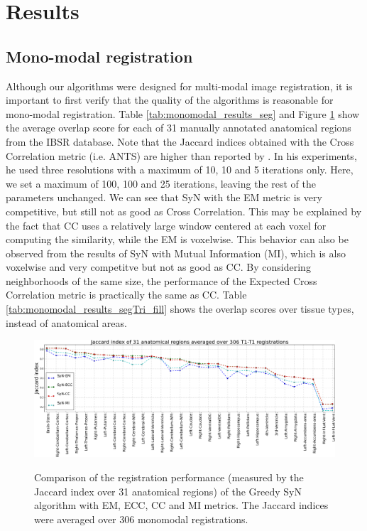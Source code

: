 \section{Results}

\subsection{Mono-modal registration}
Although our algorithms were designed for multi-modal image registration, it is important to first verify that the quality of the algorithms is reasonable for mono-modal registration. Table \ref{tab:monomodal_results_seg} and Figure \ref{fig:mono_graph_seg} show the average overlap score for each of 31 manually annotated anatomical regions from the IBSR database. Note that the Jaccard indices obtained with the Cross Correlation metric (i.e. ANTS) are higher than reported by \cite{Rohlfing2012}. In his experiments, he used
three resolutions with a maximum of 10, 10 and 5 iterations only. Here, we set a maximum of 100, 100 and 25 iterations, leaving the rest of the parameters unchanged. We can see that SyN with the EM metric is very competitive, but still not as good as Cross Correlation. This may be explained by the fact that CC uses a relatively large
window centered at each voxel for computing the similarity, while the EM is voxelwise. This behavior can also be observed from the results of SyN with Mutual Information (MI), which is also voxelwise and very competitve but not as good as CC. By considering neighborhoods of the same size, the performance of the Expected Cross Correlation metric is practically the same as CC. Table \ref{tab:monomodal_results_segTri_fill} shows the overlap scores over tissue types, instead of anatomical areas.




\begin{figure}[t!]
\centering
\includegraphics[width=1.0\linewidth]{./images/mono_lines_seg.png}\\
\caption{Comparison of the registration performance (measured by the Jaccard index over 31 anatomical regions) of the Greedy SyN algorithm with EM, ECC, CC and MI metrics. The Jaccard
indices were averaged over 306 monomodal registrations.}
\label{fig:mono_graph_seg}
\end{figure}

